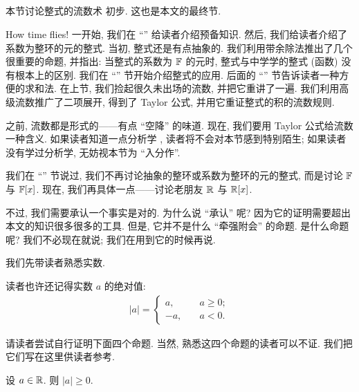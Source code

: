 \subsection*{\IntroductionToMethodOfFluxionsOnPolynomials}
\markright{\IntroductionToMethodOfFluxionsOnPolynomials}

本节讨论整式的流数术  初步. 这也是本文的最终节.

How time flies! 一开始, 我们在 ``\Prerequisites'' 给读者介绍预备知识. 然后, 我们给读者介绍了系数为整环的元的整式. 当初, 整式还是有点抽象的. 我们利用带余除法推出了几个很重要的命题, 并指出: 当整式的系数为 $\mathbb{F}$ 的元时, 整式与中学学的整式 (函数) 没有根本上的区别. 我们在 ``\Interpolation'' 节开始介绍整式的应用. 后面的 ``\SummationFormulae'' 节告诉读者一种方便的求和法. 在上节, 我们捡起很久未出场的流数, 并把它重讲了一遍. 我们利用高级流数推广了二项展开, 得到了 Taylor 公式, 并用它重证整式的积的流数规则.

之前, 流数都是形式的——有点 ``空降'' 的味道. 现在, 我们要用 Taylor 公式给流数一种含义. 如果读者知道一点分析学 , 读者将不会对本节感到特别陌生; 如果读者没有学过分析学, 无妨视本节为 ``入分作''.

我们在 ``\PolynomialsOverF'' 节说过, 我们不再讨论抽象的整环或系数为整环的元的整式, 而是讨论 $\mathbb{F}$ 与 $\mathbb{F}[x]$. 现在, 我们再具体一点——讨论老朋友 $\mathbb{R}$ 与 $\mathbb{R}[x]$.

不过, 我们需要承认一个事实是对的. 为什么说 ``承认'' 呢? 因为它的证明需要超出本文的知识很多很多的工具. 但是, 它并不是什么 ``牵强附会'' 的命题. 是什么命题呢? 我们不必现在就说; 我们在用到它的时候再说.

我们先带读者熟悉实数.

读者也许还记得实数 $a$ 的绝对值:
\begin{align*}
    |a| = \begin{cases}
        a,  & \quad a \geq 0; \\
        -a, & \quad a < 0.
    \end{cases}
\end{align*}

请读者尝试自行证明下面四个命题. 当然, 熟悉这四个命题的读者可以不证. 我们把它们写在这里供读者参考.

\begin{proposition}
    设 $a \in \mathbb{R}$. 则 $|a| \geq 0$.
\end{proposition}

